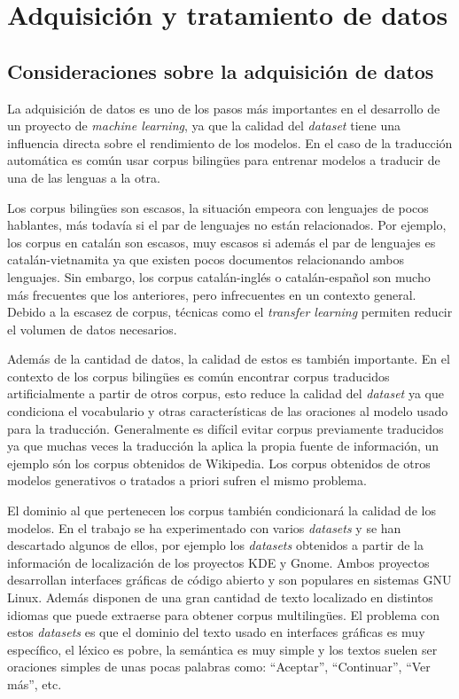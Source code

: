\chapter{Adquisición y tratamiento de datos}\label{datamangle}
\section{Consideraciones sobre la adquisición de datos}
La adquisición de datos es uno de los pasos más importantes en el desarrollo de un proyecto de \textit{machine learning}, ya que la calidad del \textit{dataset} tiene una influencia directa sobre el rendimiento de los modelos. En el caso de la traducción automática es común usar corpus biling{\"u}es para entrenar modelos a traducir de una de las lenguas a la otra.

Los corpus biling{\"u}es son escasos, la situación empeora con lenguajes de pocos hablantes, más todavía si el par de lenguajes no están relacionados. Por ejemplo, los corpus en catalán son escasos, muy escasos si además el par de lenguajes es catalán-vietnamita ya que existen pocos documentos relacionando ambos lenguajes. Sin embargo, los corpus catalán-inglés o catalán-español son mucho más frecuentes que los anteriores, pero infrecuentes en un contexto general.
Debido a la escasez de corpus, técnicas como el \textit{transfer learning} permiten reducir el volumen de datos necesarios.

Además de la cantidad de datos, la calidad de estos es también importante. En el contexto de los corpus biling{\"u}es es común encontrar corpus traducidos artificialmente a partir de otros corpus, esto reduce la calidad del \textit{dataset} ya que condiciona el vocabulario y otras características de las oraciones al modelo usado para la traducción. Generalmente es difícil evitar corpus previamente traducidos ya que muchas veces la traducción la aplica la propia fuente de información, un ejemplo són los corpus obtenidos de Wikipedia. Los corpus obtenidos de otros modelos generativos o tratados a priori sufren el mismo problema.

El dominio al que pertenecen los corpus también condicionará la calidad de los modelos. En el trabajo se ha experimentado con varios \textit{datasets} y se han descartado algunos de ellos, por ejemplo los \textit{datasets} obtenidos a partir de la información de localización de los proyectos KDE y Gnome. Ambos proyectos desarrollan interfaces gráficas de código abierto y son populares en sistemas GNU Linux. Además disponen de una gran cantidad de texto localizado en distintos idiomas que puede extraerse para obtener corpus multiling{\"u}es. El problema con estos \textit{datasets} es que el dominio del texto usado en interfaces gráficas es muy específico, el léxico es pobre, la semántica es muy simple y los textos suelen ser oraciones simples de unas pocas palabras como: ``Aceptar'', ``Continuar'', ``Ver más'', etc.

